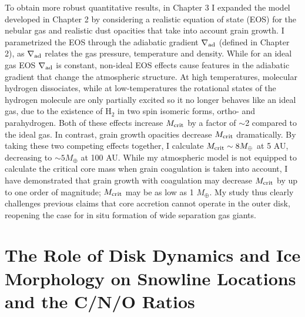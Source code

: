 To obtain more robust quantitative results, in Chapter 3 I expanded the model developed in Chapter 2 by considering a realistic equation of state (EOS) for the nebular gas and realistic dust opacities that take into account grain growth. I parametrized the EOS through the adiabatic gradient $\nabla_{\rm ad}$ (defined in Chapter 2), as $\nabla_{\rm ad}$ relates the gas pressure, temperature and density. While for an ideal gas EOS $\nabla_{\rm ad}$ is constant, non-ideal EOS effects cause features in the adiabatic gradient that change the atmospheric structure. At high temperatures, molecular hydrogen dissociates, while at low-temperatures the rotational states of the hydrogen molecule are only partially excited so it no longer behaves like an ideal gas, due to the existence of H$_2$ in two spin isomeric forms, ortho- and parahydrogen. Both of these effects increase $M_{\rm crit}$ by a factor of $\sim$2 compared to the ideal gas. In contrast, grain growth opacities decrease $M_{\rm crit}$ dramatically. By taking these two competing effects together, I calculate $M_{\rm crit} \sim 8 M_{\oplus}$ at 5 AU, decreasing to $\sim 5 M_{\oplus}$ at 100 AU. While my atmospheric model is not equipped to calculate the critical core mass when grain coagulation is taken into account, I have demonstrated that grain growth with coagulation may decrease $M_{\rm crit}$ by up to one order of magnitude; $M_{\rm crit}$ may be as low as 1 $M_{\oplus}$. My study thus clearly challenges previous claims that core accretion cannot operate in the outer disk, reopening the case for in situ formation of wide separation gas giants. 

\section{The Role of Disk Dynamics and Ice Morphology on Snowline Locations and the C/N/O Ratios}
\label{sec:volatile}

